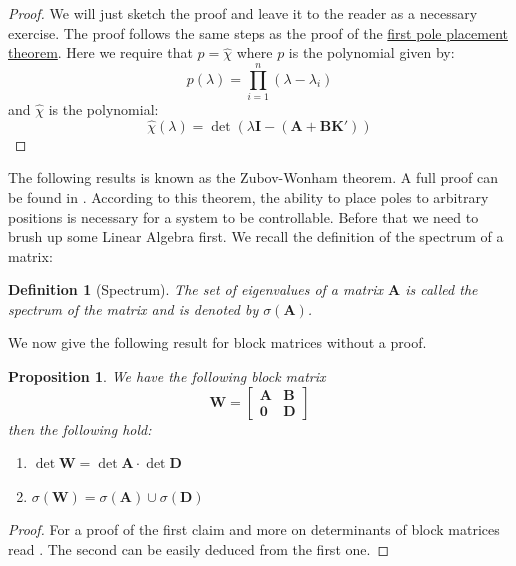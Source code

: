 \documentclass[a4paper,10pt,oneside]{book}
\newtheorem{definition}{Definition}
\newtheorem{proposition}[theorem]{Proposition}
\begin{document}
\begin{proof}
 We will just sketch the proof and leave it to the reader as
a necessary exercise. The proof follows the same steps as the proof of
the \hyperlink{thm:polePlacement}{first pole placement theorem}.
Here we require that $p=\hat{\chi}$ where $p$ is the polynomial
given by:
\begin{equation}
 p(\lambda)=\prod_{i=1}^{n} (\lambda-\lambda_i)
\end{equation}
and $\hat{\chi}$ is the polynomial:
\begin{equation}
 \hat{\chi}(\lambda)=\operatorname{det}(\lambda\mathbf{I}-(\mathbf{A}+\mathbf{BK}'))
\end{equation}
\end{proof}
The following results is known as the Zubov-Wonham theorem. A full proof
can be found in \cite{LeoShu10}. According to this theorem, the ability
to place poles to arbitrary positions is necessary for a system to be controllable.
Before that we need to brush up some Linear Algebra first. We recall the definition
of the spectrum of a matrix:
\begin{definition}[Spectrum]
 The set of eigenvalues of a matrix $\mathbf{A}$ is 
 called the spectrum of the matrix and is denoted by $\sigma(\mathbf{A})$.
\end{definition}
We now give the following result for block matrices without a proof.
\begin{proposition}
 We have the following block matrix
\begin{equation}
 \mathbf{W}=\left[ {\begin{array}{cc}
\mathbf{A} & \mathbf{B}\\
\mathbf{0} & \mathbf{D}
 \end{array} } \right]
\end{equation}
then the following hold:
\begin{enumerate}
 \item $\operatorname{det }\mathbf{W} = \operatorname{det }\mathbf{A}\cdot\operatorname{det }\mathbf{D}$
\item $\sigma(\mathbf{W})=\sigma(\mathbf{A})\cup\sigma(\mathbf{D})$
\end{enumerate}
\end{proposition}
\begin{proof}
 For a proof of the first claim and more on determinants of block matrices read \cite{John00}. The second 
 can be easily deduced from the first one.
\end{proof}
\end{document}
